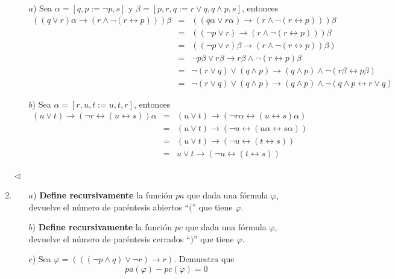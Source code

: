 \documentclass{article}
\begin{document}
\begin{enumerate}
  \begin{itemize}
  \item[$a$)] Sea $\alpha = [q, p := \neg p, s]$ y $\beta = [p, r, q := r \lor q, q \land p, s]$, entonces
    \begin{eqnarray*}
      ((q \lor r)\alpha \rightarrow (r \land \neg(r \leftrightarrow p)))\beta
      &=& ((q\alpha \lor r\alpha) \rightarrow (r \land \neg(r \leftrightarrow p)))\beta\\
      &=& ((\neg p \lor r) \rightarrow (r \land \neg(r \leftrightarrow p)))\beta\\
      &=& ((\neg p \lor r)\beta \rightarrow (r \land \neg(r \leftrightarrow p))\beta)\\
      &=& \neg p\beta \lor r\beta \rightarrow r\beta \land \neg(r \leftrightarrow p)\beta\\
      &=& \neg (r \lor q) \lor (q \land p) \rightarrow (q \land p) \land \neg(r\beta \leftrightarrow p\beta)\\
      &=& \neg (r \lor q) \lor (q \land p) \rightarrow (q \land p) \land \neg(q \land p \leftrightarrow r \lor q)
    \end{eqnarray*}
  \item[$b$)] Sea $\alpha = [r, u, t := u, t, r]$, entonces
    \begin{eqnarray*}
      (u \lor t) \rightarrow (\neg r \leftrightarrow (u \leftrightarrow s))\alpha
      &=& (u \lor t) \rightarrow (\neg r\alpha \leftrightarrow (u \leftrightarrow s)\alpha)\\
      &=& (u \lor t) \rightarrow (\neg u \leftrightarrow (u\alpha \leftrightarrow s\alpha))\\
      &=& (u \lor t) \rightarrow (\neg u \leftrightarrow (t \leftrightarrow s))\\
      &=& u \lor t \rightarrow (\neg u \leftrightarrow (t \leftrightarrow s))
    \end{eqnarray*}    
  \end{itemize}
  \hfill $\lhd$
\item
  \begin{itemize}
  \item[$a$)] \textbf{Define recursivamente} la función $pa$ que dada una fórmula $\varphi$, devuelve el número
    de paréntesis abiertos ``$($'' que tiene $\varphi$.
  \item[$b$)] \textbf{Define recursivamente} la función $pc$ que dada una fórmula $\varphi$, devuelve el número
    de paréntesis cerrados ``$)$'' que tiene $\varphi$.
  \item[$c$)] Sea $\varphi = (((\neg p \land q) \lor \neg r) \rightarrow r)$. Demuestra que
    \[
    pa(\varphi) - pc(\varphi) = 0
    \]
  \end{itemize}
\end{enumerate}
\end{document}

